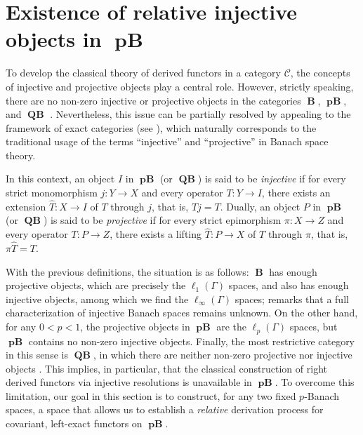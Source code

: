 \documentclass[12pt,a4paper]{amsproc}
\theoremstyle{remark}
\theoremstyle{definition}
\newcommand{\QBan}{\operatorname{\textbf{QB}}}
\newcommand{\pBan}{\operatorname{\textbf{pB}}}
\newcommand{\Ban}{\operatorname{\textbf{B}}}
\numberwithin{equation}{section}
\begin{document}
\section{Existence of relative injective objects in $\pBan$}  \label{main}
\par To develop the classical theory of derived functors in a category $\mathcal{C}$, the concepts of injective and projective objects play a central role. However, strictly speaking, there are no non-zero injective or projective objects in the categories $\boldsymbol{\Ban}$, $\boldsymbol{\pBan}$, and $\boldsymbol{\QBan}$ \cite{pothoven}. Nevertheless, this issue can be partially resolved by appealing to the framework of exact categories (see \cite[Chapter 3]{exact_categ}), which naturally corresponds to the traditional usage of the terms ``injective'' and ``projective'' in Banach space theory.
\par In this context, an object $I$ in $\boldsymbol{\pBan}$ (or $\boldsymbol{\QBan}$) is said to be \emph{injective} if for every strict monomorphism $j: Y \to X$ and every operator $T: Y \to I$, there exists an extension $\hat{T}: X \to I$ of $T$ through $j$, that is, $\hat{T}j = T$. Dually, an object $P$ in $\boldsymbol{\pBan}$ (or $\boldsymbol{\QBan}$) is said to be \emph{projective} if for every strict epimorphism $\pi: X \to Z$ and every operator $T: P \to Z$, there exists a lifting $\hat{T}: P \to X$ of $T$ through $\pi$, that is, $\pi \hat{T} = T$.
\par With the previous definitions, the situation is as follows: $\Ban$ has enough projective objects, which are precisely the $\ell_1(\Gamma)$ spaces, and also has enough injective objects, among which we find the $\ell_{\infty}(\Gamma)$ spaces; remarks that a full characterization of injective Banach spaces remains unknown. On the other hand, for any $0<p<1$, the projective objects in $\pBan$ are the $\ell_p(\Gamma)$ spaces, but $\pBan$ contains no non-zero injective objects. Finally, the most restrictive category in this sense is $\QBan$, in which there are neither non-zero projective nor injective objects \cite[2.9]{hmbst}. This implies, in particular, that the classical construction of right derived functors via injective resolutions is unavailable in $\boldsymbol{\pBan}$. To overcome this limitation, our goal in this section is to construct, for any two fixed $p$-Banach spaces, a space that allows us to establish a \emph{relative} derivation process for covariant, left-exact functors on $\boldsymbol{\pBan}$.
	
\end{document}
